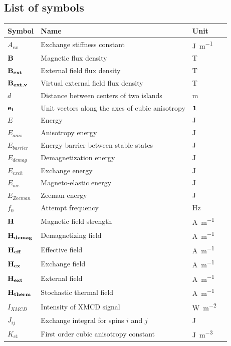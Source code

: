 \documentclass[11pt,a4paper,english]{article}
\begin{document}
\subsection*{List of symbols}
\begin{longtable}{llll}
\toprule
\bfseries Symbol & \bfseries Name &
\bfseries Unit \\\midrule\endhead
$A_{ex}$ & Exchange stiffness constant & \si{\joule\per\metre} \\
$\vb{B}$ & Magnetic flux density & \si{\tesla} \\
$\vb{B_{ext}}$ & External field flux density & \si{\tesla} \\
$\vb{B_{ext,v}}$ & Virtual external field flux density & \si{\tesla} \\
$d$ & Distance between centers of two islands & \si{\metre} \\
$\vb{e_i}$ & Unit vectors along the axes of cubic anisotropy & $\vb{1}$ \\
$E$ & Energy & \si{\joule} \\
$E_{anis}$ & Anisotropy energy & \si{\joule} \\
$E_{barrier}$ & Energy barrier between stable states & \si{\joule} \\
$E_{demag}$ & Demagnetization energy & \si{\joule} \\
$E_{exch}$ & Exchange energy & \si{\joule} \\
$E_{me}$ & Magneto-elastic energy & \si{\joule} \\
$E_{Zeeman}$ & Zeeman energy & \si{\joule} \\
$f_0$ & Attempt frequency & \si{\hertz} \\
$\vb{H}$ & Magnetic field strength & \si{\ampere\per\metre} \\
$\vb{H_{demag}}$ & Demagnetizing field & \si{\ampere\per\metre} \\
$\vb{H_{eff}}$ & Effective field & \si{\ampere\per\metre} \\
$\vb{H_{ex}}$ & Exchange field & \si{\ampere\per\metre} \\
$\vb{H_{ext}}$ & External field & \si{\ampere\per\metre} \\
$\vb{H_{therm}}$ & Stochastic thermal field & \si{\ampere\per\metre} \\
$I_{XMCD}$ & Intensity of XMCD signal & \si{\watt\per\metre\squared} \\
$J_{ij}$ & Exchange integral for spins $i$ and $j$ & \si{\joule} \\
$K_{c1}$ & First order cubic anisotropy constant & \si{\joule\per\metre\cubed} \\

\end{longtable}
\end{document}
